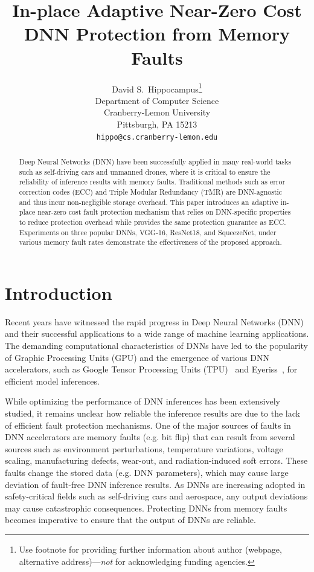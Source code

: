 \documentclass{article}
\title{In-place Adaptive Near-Zero Cost DNN Protection from Memory Faults}
\author{%
  David S.~Hippocampus\thanks{Use footnote for providing further information
    about author (webpage, alternative address)---\emph{not} for acknowledging
    funding agencies.} \\
  Department of Computer Science\\
  Cranberry-Lemon University\\
  Pittsburgh, PA 15213 \\
  \texttt{hippo@cs.cranberry-lemon.edu} \\
}
\begin{document}
\maketitle

\begin{abstract}
Deep Neural Networks (DNN) have been successfully applied in many real-world tasks such as self-driving cars and unmanned drones, where it is critical to ensure the reliability of inference results with memory faults.
Traditional methods such as error correction codes (ECC) and Triple Modular Redundancy (TMR) are DNN-agnostic and thus incur non-negligible storage overhead. This paper introduces an adaptive in-place near-zero cost fault protection mechanism that relies on DNN-specific properties to reduce protection overhead while provides the same protection guarantee as ECC. Experiments on three popular DNNs, VGG-16, ResNet18, and SqueezeNet, under various memory fault rates demonstrate the effectiveness of the proposed approach.       


\end{abstract}

\section{Introduction}
Recent years have witnessed the rapid progress in Deep Neural Networks (DNN) and their successful applications to a wide range of machine learning applications. The demanding computational characteristics of DNNs have led to the popularity of Graphic Processing Units (GPU) and the emergence of various DNN accelerators, such as Google Tensor Processing Units (TPU)~\cite{jouppi2017datacenter} and Eyeriss~\cite{chen2017eyeriss}, for efficient model inferences. 

While optimizing the performance of DNN inferences has been extensively studied, it remains unclear how reliable the inference results are due to the lack of efficient fault protection mechanisms. One of the major sources of faults in DNN accelerators are memory faults (e.g. bit flip) that can result from several sources such as environment perturbations, temperature variations, voltage scaling, manufacturing defects, wear-out, and radiation-induced soft errors. These faults change the stored data (e.g. DNN parameters), which may cause large deviation of fault-free DNN inference results. As DNNs are increasing adopted in safety-critical fields such as self-driving cars and aerospace, any output deviations may cause catastrophic consequences. Protecting DNNs from memory faults becomes imperative to ensure that the output of DNNs are reliable.   
\end{document}
